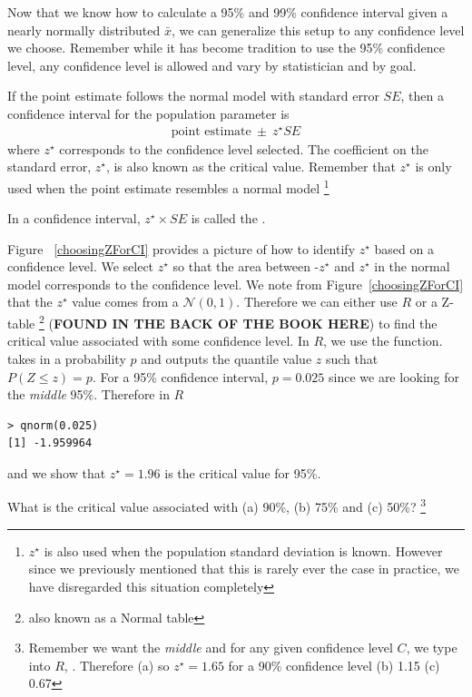 Now that we know how to calculate a 95\% and 99\% confidence interval given a nearly normally distributed $\bar{x}$, we can generalize this setup to any confidence level we choose. Remember while it has become tradition to use the 95\% confidence level, any confidence level is allowed and vary by statistician and by goal. 

\begin{termBox}{
If the point estimate follows the normal model with standard error $SE$, then a confidence interval for the population parameter is
\begin{eqnarray*}
\text{point estimate}\ \pm\ z^{\star} SE
\end{eqnarray*}
where $z^{\star}$ corresponds to the confidence level selected. The coefficient on the standard error, $z^{\star}$, is also known as the critical value. Remember that $z^{\star}$ is only used when the point estimate resembles a normal model \footnote{$z^{\star}$ is also used when the population standard deviation is known. However since we previously mentioned that this is rarely ever the case in practice, we have disregarded this situation completely}}
\end{termBox}
\begin{termBox}{
\label{marginOfErrorTermBox}In a confidence interval, $z^{\star}\times SE$ is called the .}
\end{termBox}

Figure ~\ref{choosingZForCI} provides a picture of how to identify $z^{\star}$ based on a confidence level. We select $z^{\star}$ so that the area between -$z^{\star}$ and $z^{\star}$ in the normal model corresponds to the confidence level. We note from Figure~\ref{choosingZForCI} that the $z^{\star}$ value comes from a $\mathcal{N}(0,1)$. Therefore we can either use $R$ or a Z-table \footnote{also known as a Normal table} (\textbf{FOUND IN THE BACK OF THE BOOK HERE}) to find the critical value associated with some confidence level. In $R$, we use the  function.  takes in a probability $p$ and outputs the quantile value $z$ such that $P(Z\leq z)=p$. For a 95\% confidence interval, $p=0.025$ since we are looking for the \emph{middle} 95\%. Therefore in $R$\begin{verbatim}
> qnorm(0.025)
[1] -1.959964
\end{verbatim}
and we show that $z^{\star}=1.96$ is the critical value for 95\%. 
\begin{exercise} 
What is the critical value associated with (a) 90\%, (b) 75\% and (c) 50\%? \footnote{Remember we want the \emph{middle} and for any given confidence level $C$, we type into $R$, . Therefore (a)  so $z^{\star}=1.65$ for a 90\% confidence level (b) 1.15 (c) 0.67}
\end{exercise}


